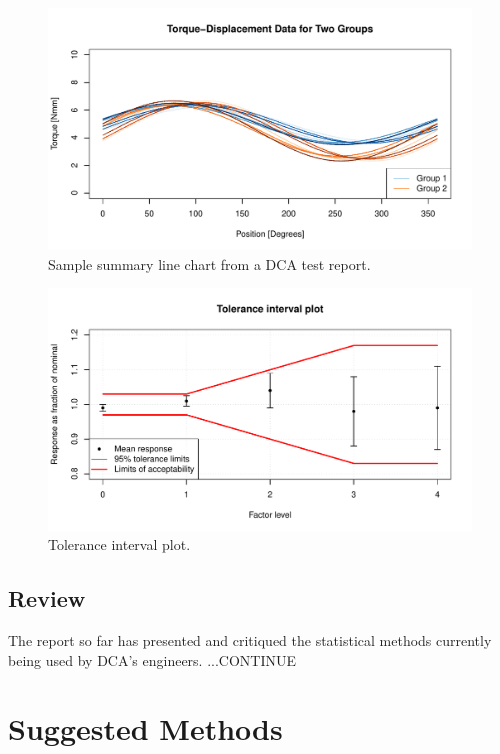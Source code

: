 \documentclass[11pt,a4paper,article]{memoir} %
\begin{document}
\begin{figure}
	\includegraphics[width=\textwidth]{overlaid_line_chart.pdf}
	\caption{Sample summary line chart from a DCA test report.}
	\label{fig:line_plots}
\end{figure}
\begin{figure}
	\includegraphics[width=\textwidth]{tolerance_intervals_plot.pdf}
	\caption{Tolerance interval plot.}
	\label{fig:tolerance_intervals_plot}
\end{figure}

\section{Review}
The report so far has presented and critiqued the statistical methods currently being used by DCA's engineers. ...CONTINUE

\chapter{Suggested Methods}\label{suggested_methods}
\label{chap:modernstats}
\end{document}

